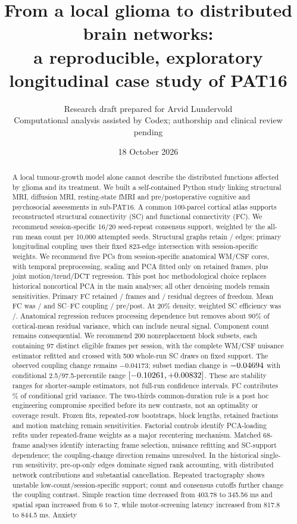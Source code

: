 \documentclass[11pt,a4paper]{article}
\title{From a local glioma to distributed brain networks:\\a reproducible, exploratory longitudinal case study of PAT16}
\author{Research draft prepared for Arvid Lundervold\\\small Computational analysis assisted by Codex; authorship and clinical review pending}
\date{18 October 2026}
\begin{document}
\maketitle
\begin{abstract}
A local tumour-growth model alone cannot describe the distributed functions affected by glioma and its treatment. We built a self-contained Python study linking structural MRI, diffusion MRI, resting-state fMRI and pre/postoperative cognitive and psychosocial assessments in sub-PAT16. A common 100-parcel cortical atlas supports reconstructed structural connectivity (SC) and functional connectivity (FC). We recommend session-specific 16/20 seed-repeat consensus support, weighted by the all-run mean count per 10,000 attempted seeds. Structural graphs retain \PreConsensusEdges{}/\PostConsensusEdges{} edges; primary longitudinal coupling uses their fixed 823-edge intersection with session-specific weights. We recommend five PCs from session-specific anatomical WM/CSF cores, with temporal preprocessing, scaling and PCA fitted only on retained frames, plus joint motion/trend/DCT regression. This post hoc methodological choice replaces historical noncortical PCA in the main analyses; all other denoising models remain sensitivities. Primary FC retained \PreFrames{}/\PostFrames{} frames and \PreDof{}/\PostDof{} residual degrees of freedom. Mean FC was \PreMeanFCPrimary{}/\PostMeanFCPrimary{} and SC--FC coupling \PreCoupling{}/\PostCoupling{} pre/post. At 20\% density, weighted SC efficiency was \PreSCWeightedE{}/\PostSCWeightedE{}. Anatomical regression reduces processing dependence but removes about 90\% of cortical-mean residual variance, which can include neural signal. Component count remains consequential. We recommend 200 nonreplacement block subsets, each containing 97 distinct eligible frames per session, with the complete WM/CSF nuisance estimator refitted and crossed with 500 whole-run SC draws on fixed support. The observed coupling change remains $-0.04173$; subset median change is $-0.04694{}$ with conditional 2.5/97.5-percentile range $[-0.10261{},+0.00832{}]$. These are stability ranges for shorter-sample estimators, not full-run confidence intervals. FC contributes \PrimaryFCShare{}\% of conditional grid variance. The two-thirds common-duration rule is a post hoc engineering compromise specified before its new contrasts, not an optimality or coverage result. Frozen fits, repeated-row bootstraps, block lengths, retained fractions and motion matching remain sensitivities. Factorial controls identify PCA-loading refits under repeated-frame weights as a major recentering mechanism. Matched 68-frame analyses identify interacting frame selection, nuisance refitting and SC-support dependence; the coupling-change direction remains unresolved. In the historical single-run sensitivity, pre-op-only edges dominate signed rank accounting, with distributed network contributions and substantial cancellation. Repeated tractography shows unstable low-count/session-specific support; count and consensus cutoffs further change the coupling contrast. Simple reaction time decreased from 403.78 to 345.56 ms and spatial span increased from 6 to 7, while motor-screening latency increased from 817.8 to 844.5 ms. Anxiety 
\end{abstract}
\end{document}
